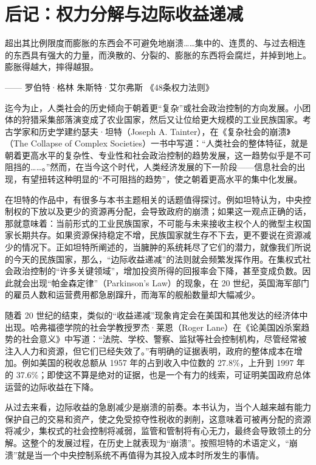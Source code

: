 \thispagestyle{empty}
\chapter*{后记：权力分解与边际收益递减}

\begin{tcolorbox}
\kaishu 超出其比例限度而膨胀的东西会不可避免地崩溃……集中的、连贯的、与过去相连的东西具有强大的力量，而涣散的、分裂的、膨胀的东西将会腐烂，并掉到地上。膨胀得越大，摔得越狠。
\begin{flushright}
—— 罗伯特·格林 朱斯特·艾尔弗斯 《48条权力法则》
\end{flushright}
\end{tcolorbox}

迄今为止，人类社会的历史倾向于朝着更“复杂”或社会政治控制的方向发展。小团体的狩猎采集部落演变成了农业国家，然后又让位给更大规模的工业民族国家。考古学家和历史学建约瑟夫·坦特（Joseph A. Tainter），在《复杂社会的崩溃》（The Collapse of Complex Societies）一书中写道：“人类社会的整体特征，就是朝着更高水平的复杂性、专业性和社会政治控制的趋势发展，这一趋势似乎是不可阻挡的……。”然而，在当今这个时代，人类经济发展的下一阶段——信息社会的出现，有望扭转这种明显的“不可阻挡的趋势”，使之朝着更高水平的集中化发展。

在坦特的作品中，有很多与本书主题相关的话题值得探讨。例如坦特认为，中央控制权的下放以及更少的资源再分配，会导致政府的崩溃；如果这一观点正确的话，那就意味着：当前形式的工业民族国家，不可能与未来接收主权个人的微型主权国家长期共存。如果资源保持稳定不增，民族国家就生存不下去，更不要说在资源减少的情况下。正如坦特所阐述的，当臃肿的系统耗尽了它们的潜力，就像我们所说的今天的民族国家，那么，“边际收益递减”的法则就会频繁发挥作用。在集权式社会政治控制的“许多关键领域”，增加投资所得的回报率会下降，甚至变成负数。因此就会出现“帕金森定律”（Parkinson's Law）的现象，在 20 世纪，英国海军部门的雇员人数和运营费用都急剧蹿升，而海军的舰船数量却大幅减少。

随着 20 世纪的结束，类似的“收益递减”现象肯定会在美国和其他发达的经济体中出现。哈弗福德学院的社会学教授罗杰·莱恩（Roger Lane）在《论美国凶杀案趋势的社会意义》中写道：“法院、学校、警察、监狱等社会控制机构，尽管经常被注入人力和资源，但它们已经失效了。”有明确的证据表明，政府的整体成本在增加。例如美国的税收总额从 1957 年的占到收入中位数的 27.8\%，上升到 1997 年的 37.6\%；即使这不算是绝对的证据，也是一个有力的线索，可证明美国政府总体运营的边际收益在下降。

从过去来看，边际收益的急剧减少是崩溃的前奏。本书认为，当个人越来越有能力保护自己的交易和资产，使之免受掠夺性税收的剥削，这意味着可被再分配的资源将减少，集权式的社会控制将减弱，监管和管制将有心无力，最终会导致领土的分解。这整个的发展过程，在历史上就表现为“崩溃”。按照坦特的术语定义，“崩溃”就是当一个中央控制系统不再值得为其投入成本时所发生的事情。

